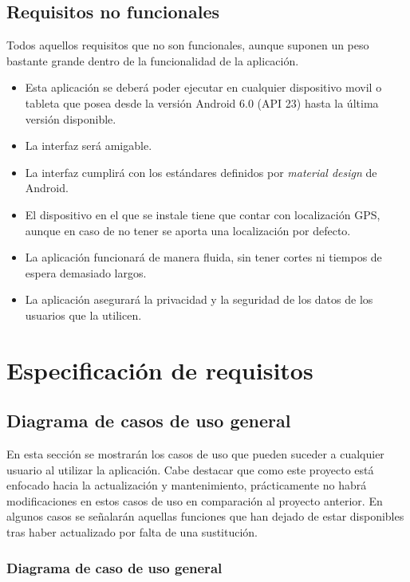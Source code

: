 \subsection{Requisitos no funcionales}

Todos aquellos requisitos que no son funcionales, aunque suponen un peso bastante grande dentro de la funcionalidad de la aplicación.

\begin{itemize}
\item Esta aplicación se deberá poder ejecutar en cualquier dispositivo movil o tableta que posea desde la versión Android 6.0 (API 23) hasta la última versión disponible.
\item La interfaz será amigable.
\item La interfaz cumplirá con los estándares definidos por \textit{material design} \cite{matDes} de Android.
\item El dispositivo en el que se instale tiene que contar con localización GPS, aunque en caso de no tener se aporta una localización por defecto.
\item La aplicación funcionará de manera fluida, sin tener cortes ni tiempos de espera demasiado largos.
\item La aplicación asegurará la privacidad y la seguridad de los datos de los usuarios que la utilicen. 
\end{itemize}

\section{Especificación de requisitos}

\subsection{Diagrama de casos de uso general}

En esta sección se mostrarán los casos de uso que pueden suceder a cualquier usuario al utilizar la aplicación. Cabe destacar que como este proyecto está enfocado hacia la actualización y mantenimiento, prácticamente no habrá modificaciones en estos casos de uso en comparación al proyecto anterior. En algunos casos se señalarán aquellas funciones que han dejado de estar disponibles tras haber actualizado por falta de una sustitución.

\subsubsection{Diagrama de caso de uso general}

